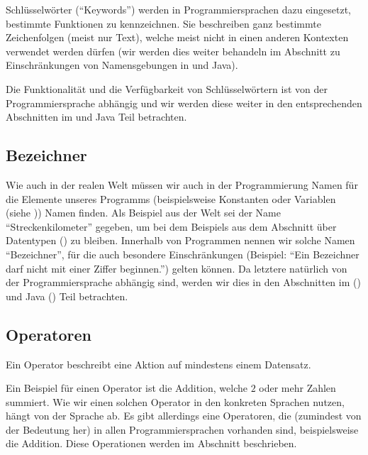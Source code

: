 	Schlüsselwörter (\enquote{Keywords}) werden in Programmiersprachen dazu eingesetzt, bestimmte Funktionen zu kennzeichnen. Sie beschreiben ganz bestimmte Zeichenfolgen (meist nur Text), welche meist nicht in einen anderen Kontexten verwendet werden dürfen (wir werden dies weiter behandeln im Abschnitt zu Einschränkungen von Namensgebungen in \racket und Java).
	
	Die Funktionalität und die Verfügbarkeit von Schlüsselwörtern ist von der Programmiersprache abhängig und wir werden diese weiter in den entsprechenden Abschnitten im \racket und Java Teil betrachten.

\subsection{Bezeichner} \functionalMark \imperativeMark \oopMark
	
	Wie auch in der realen Welt müssen wir auch in der Programmierung Namen für die Elemente unseres Programms (beispielsweise Konstanten oder Variablen (siehe )) Namen finden. Als Beispiel aus der Welt sei der Name \enquote{Streckenkilometer} gegeben, um bei dem Beispiels aus dem Abschnitt über Datentypen () zu bleiben. Innerhalb von Programmen nennen wir solche Namen \enquote{Bezeichner}, für die auch besondere Einschränkungen (Beispiel: \enquote{Ein Bezeichner darf nicht mit einer Ziffer beginnen.}) gelten können. Da letztere natürlich von der Programmiersprache abhängig sind, werden wir dies in den Abschnitten im \racket () und Java () Teil betrachten.

\subsection{Operatoren} \functionalMark \imperativeMark \oopMark

	Ein Operator beschreibt eine Aktion auf mindestens einem Datensatz.
	
	Ein Beispiel für einen Operator ist die Addition, welche $ 2 $ oder mehr Zahlen summiert. Wie wir einen solchen Operator in den konkreten Sprachen nutzen, hängt von der Sprache ab. Es gibt allerdings eine Operatoren, die (zumindest von der Bedeutung her) in allen Programmiersprachen vorhanden sind, beispielsweise die Addition. Diese Operationen werden im Abschnitt  beschrieben.

